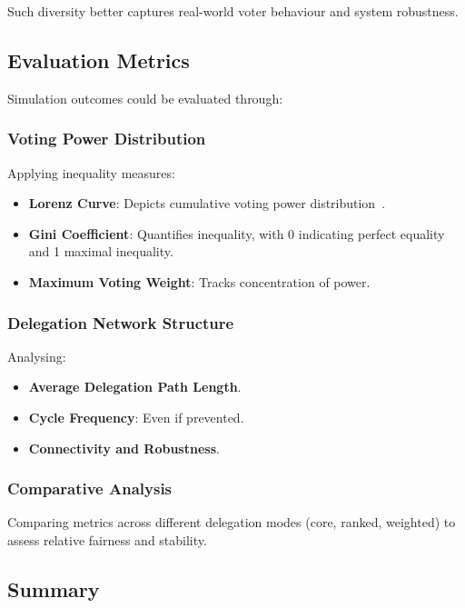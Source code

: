 Such diversity better captures real-world voter behaviour and system robustness.

\subsection{Evaluation Metrics}

Simulation outcomes could be evaluated through:

\subsubsection{Voting Power Distribution}

Applying inequality measures:

\begin{itemize}
    \item \textbf{Lorenz Curve}: Depicts cumulative voting power distribution~\citep{cowell_measuring_inequality}.
    \item \textbf{Gini Coefficient}: Quantifies inequality, with 0 indicating perfect equality and 1 maximal inequality.
    \item \textbf{Maximum Voting Weight}: Tracks concentration of power.
\end{itemize}

\subsubsection{Delegation Network Structure}

Analysing:

\begin{itemize}
    \item \textbf{Average Delegation Path Length}.
    \item \textbf{Cycle Frequency}: Even if prevented.
    \item \textbf{Connectivity and Robustness}.
\end{itemize}

\subsubsection{Comparative Analysis}

Comparing metrics across different delegation modes (core, ranked, weighted) to assess relative fairness and stability.

\subsection{Summary}

